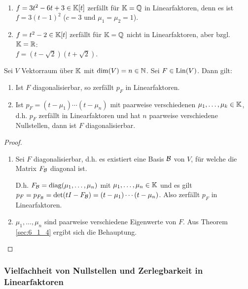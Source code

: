 \begin{bspe}\
	\begin{enumerate}
		\item
			$ f = 3t^2-6t+3 \in \mathbb K[t] $ zerfällt für $ \mathbb K = \mathbb Q $ in Linearfaktoren, denn es ist \\
			$ f = 3(t-1)^2 $ ($ c=3 $ und $ \mu_1=\mu_2=1 $).
		\item
			$ f = t^2 - 2 \in \mathbb K[t] $ zerfällt für $ \mathbb K = \mathbb Q $ nicht in Linearfaktoren, aber bzgl. $ \mathbb K = \mathbb R $: \\
			$ f = (t-\sqrt{2})(t+\sqrt{2}) $.
	\end{enumerate}
\end{bspe}

\begin{thm}
	Sei $ V $ Vektorraum über $ \mathbb K $ mit $ \dim(V) = n \in \mathbb N $. Sei $ F \in \operatorname{Lin}(V) $. Dann gilt:
	\begin{enumerate}
		\item
			Ist $ F $ diagonalisierbar, so zerfällt $ p_F $ in Linearfaktoren.
		\item
			Ist $ p_F = (t-\mu_1) \cdots (t-\mu_n) $ mit paarweise verschiedenen $ \mu_1, \ldots, \mu_k \in \mathbb K $, d.h. $ p_F $ zerfällt in Linearfaktoren und hat $ n $ paarweise verschiedene Nullstellen, dann ist $ F $ diagonalisierbar.
	\end{enumerate}
\end{thm}
\begin{proof}\
	\begin{enumerate}
		\item
			Sei $ F $ diagonalisierbar, d.h. es existiert eine Basis $ \mathcal{B} $ von $ V $, für welche die Matrix $ F_{\mathcal{B}} $ diagonal ist.
			
			D.h. $ F_{\mathcal{B}} = \operatorname{diag}(\mu_1, \ldots, \mu_n) $ mit $ \mu_1, \ldots, \mu_n \in \mathbb K $ und es gilt $ p_F = p_{F_{\mathcal{B}}} = \det(tI - F_{\mathcal{B}}) = (t-\mu_1) \cdots (t-\mu_n) $. Also zerfällt $ p_F $ in Linearfaktoren.
		\item
			$ \mu_1, \ldots, \mu_n $ sind paarweise verschiedene Eigenwerte von $ F $. Aus Theorem \ref{sec:6_1_4} ergibt sich die Behauptung. \qedhere
	\end{enumerate}
\end{proof}

\subsubsection{Vielfachheit von Nullstellen und Zerlegbarkeit in Linearfaktoren}

